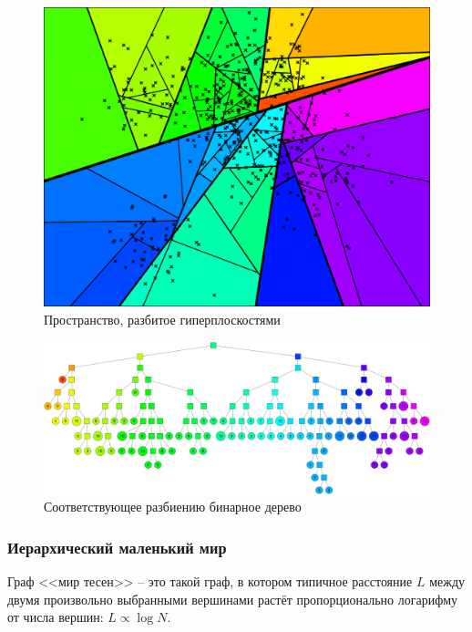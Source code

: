 \begin{figure}[H]
    \centering
    \includegraphics[scale=0.5]{inc/img/annspace.png}
    \caption{Пространство, разбитое гиперплоскостями}
\end{figure}

\begin{figure}[H]
    \centering
    \includegraphics[scale=0.57]{inc/img/anntree.png}
    \caption{Соответствующее разбиению бинарное дерево}
\end{figure}

\subsubsection{Иерархический маленький мир}
Граф <<мир тесен>> -- это такой граф, в котором типичное расстояние $L$ между двумя
произвольно выбранными вершинами растёт пропорционально логарифму от числа
вершин: $L \propto \log{N}$.

